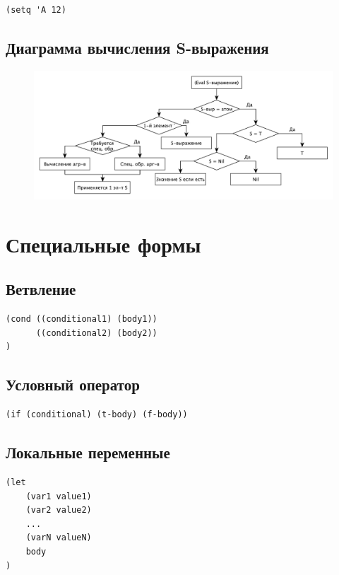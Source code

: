 \begin{lstlisting}
(setq 'A 12)
\end{lstlisting}

\subsection{Диаграмма вычисления S-выражения}

\begin{figure}[H]
    \centering
    \includegraphics[scale=0.7]{img/running.pdf}
\end{figure}

\section{Специальные формы}

\subsection{Ветвление}

\begin{lstlisting}
(cond ((conditional1) (body1))
      ((conditional2) (body2))
)
\end{lstlisting}

\subsection{Условный оператор}

\begin{lstlisting}
(if (conditional) (t-body) (f-body))
\end{lstlisting}

\subsection{Локальные переменные}

\begin{lstlisting}
(let
    (var1 value1)
    (var2 value2)
    ...
    (varN valueN)
    body
)
\end{lstlisting}

